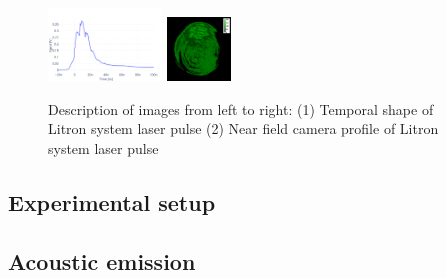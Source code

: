         \begin{figure}[h]
        \begin{center}

        \includegraphics[width=0.27\textwidth,valign=c]{img/temporal_profile_new.png}
        \label{fig:profile}
        \includegraphics[width=0.15\textwidth,valign=c]{img/C2-v3_36_mJ_scale.png}
        \label{fig:profile}

        \caption{Description of images from left to right: (1) Temporal shape of Litron system laser pulse (2) Near field camera profile of Litron system laser pulse}
        \label{fig:profile}
        \end{center}

        \end{figure}
    



\subsection{Experimental setup}


\subsection{Acoustic emission}

